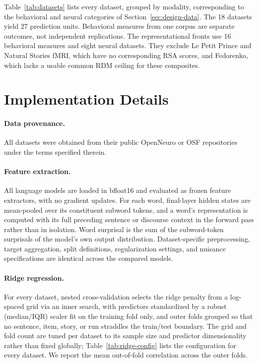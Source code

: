 Table~\ref{tab:datasets} lists every dataset, grouped by modality, corresponding to the behavioral and neural categories of Section~\ref{sec:design-data}. The 18 datasets yield 27 prediction units. Behavioral measures from one corpus are separate outcomes, not independent replications. The representational fronts use 16 behavioral measures and eight neural datasets. They exclude Le Petit Prince and Natural Stories fMRI, which have no corresponding RSA scores, and Fedorenko, which lacks a usable common RDM ceiling for these composites.



\section{Implementation Details}
\label{app:implementation}

\paragraph{Data provenance.} All datasets were obtained from their public OpenNeuro or OSF repositories under the terms specified therein.

\paragraph{Feature extraction.} All language models are loaded in bfloat16 and evaluated as frozen feature extractors, with no gradient updates. For each word, final-layer hidden states are mean-pooled over its constituent subword tokens, and a word's representation is computed with its full preceding sentence or discourse context in the forward pass rather than in isolation. Word surprisal is the sum of the subword-token surprisals of the model's own output distribution. Dataset-specific preprocessing, target aggregation, split definitions, regularization settings, and nuisance specifications are identical across the compared models.

\paragraph{Ridge regression.} For every dataset, nested cross-validation selects the ridge penalty from a log-spaced grid via an inner search, with predictors standardized by a robust (median/IQR) scaler fit on the training fold only, and outer folds grouped so that no sentence, item, story, or run straddles the train/test boundary. The grid and fold count are tuned per dataset to its sample size and predictor dimensionality rather than fixed globally; Table~\ref{tab:ridge-config} lists the configuration for every dataset. We report the mean out-of-fold correlation across the outer folds.

